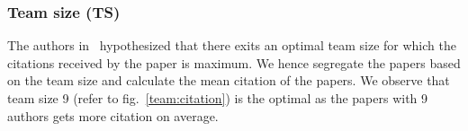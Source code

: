 \subsubsection{Team size (TS)}
The authors in~\cite{chakraborty2014towards} hypothesized that there exits an optimal team size for which the citations received by the paper is maximum. We hence segregate the papers based on the team size and calculate the mean citation of the papers. We observe that team size 9 (refer to fig.~\ref{team:citation}) is the optimal as the papers with 9 authors gets more citation on average.

\medskip